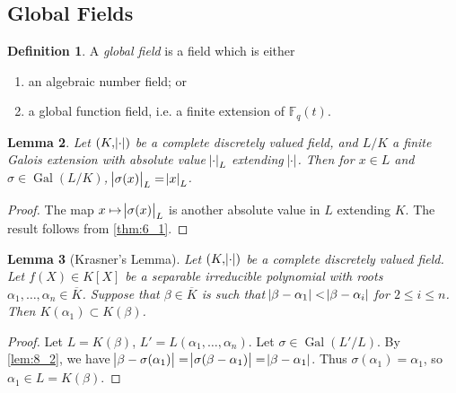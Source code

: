 \documentclass[11pt]{article}
\theoremstyle{definition}
\newtheorem{definition}{Definition}[subsection]
\theoremstyle{plain}
\newtheorem{lemma}[definition]{Lemma}
\theoremstyle{remark}
\DeclareMathOperator{\Gal}{Gal}
\newcommand{\FF}{\mathbb{F}}
\begin{document}
\subsection{Global Fields}

\begin{definition}\label{def:8_1}
    A \emph{global field} is a field which is either
    \begin{enumerate}
        \item an algebraic number field; or
        \item a global function field, i.e. a finite extension of $\FF_q(t)$.
    \end{enumerate}
\end{definition}

\begin{lemma}\label{lem:8_2}
    Let $(K, \abs{\cdot})$ be a complete discretely valued field, and $L/K$ a finite Galois extension with absolute value $\abs{\cdot}_L$ extending $\abs{\cdot}$. Then for $x \in L$ and $\sigma \in \Gal(L/K)$, $\abs{\sigma(x)}_L = \abs{x}_L$.
\end{lemma}
\begin{proof}
    The map $x \mapsto \abs{\sigma(x)}_L$ is another absolute value in $L$ extending $K$. The result follows from \autoref{thm:6_1}.
\end{proof}

\begin{lemma}[Krasner's Lemma]\label{lem:8_3}
    Let $(K, \abs{\cdot})$ be a complete discretely valued field. Let $f(X) \in K[X]$ be a separable irreducible polynomial with roots $\alpha_1, \ldots, \alpha_n \in \overline{K}$. Suppose that $\beta \in \overline{K}$ is such that $\abs{\beta - \alpha_1} < \abs{\beta - \alpha_i}$ for $2 \le i \le n$. Then $K(\alpha_1) \subset K(\beta)$.
\end{lemma}
\begin{proof}
    Let $L = K(\beta)$, $L' = L(\alpha_1, \ldots, \alpha_n)$. Let $\sigma \in \Gal(L' / L)$. By \autoref{lem:8_2}, we have $\abs{\beta - \sigma(\alpha_1)} = \abs{\sigma(\beta - \alpha_1)} = \abs{\beta - \alpha_1}$. Thus $\sigma(\alpha_1) = \alpha_1$, so $\alpha_1 \in L = K(\beta)$.
\end{proof}
\end{document}
